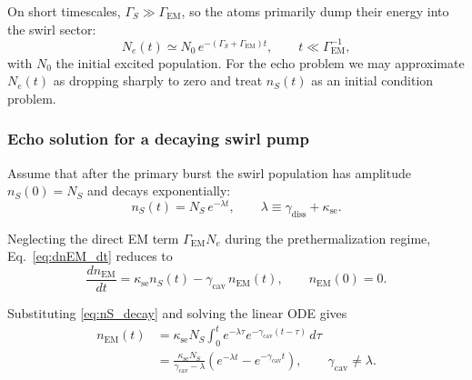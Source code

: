         On short timescales, $\Gamma_S \gg \Gamma_{\mathrm{EM}}$, so the atoms
        primarily dump their energy into the swirl sector:
        \begin{equation}
            N_e(t)
            \simeq
            N_0\, e^{-(\Gamma_S + \Gamma_{\mathrm{EM}}) t},
            \qquad
            t \ll \Gamma_{\mathrm{EM}}^{-1},
        \end{equation}
        with $N_0$ the initial excited population. For the echo problem we may
        approximate $N_e(t)$ as dropping sharply to zero and treat
        $n_S(t)$ as an initial condition problem.

    \subsubsection{Echo solution for a decaying swirl pump}
        \label{subsubsec:echo_solution}

        Assume that after the primary burst the swirl population has amplitude
        $n_S(0) = N_S$ and decays exponentially:
        \begin{equation}
            n_S(t)
            =
            N_S \, e^{-\lambda t},
            \qquad
            \lambda \equiv \gamma_{\mathrm{diss}} + \kappa_{\text{se}}.
            \label{eq:nS_decay}
        \end{equation}

        Neglecting the direct EM term $\Gamma_{\mathrm{EM}} N_e$ during the
        prethermalization regime, Eq.~\eqref{eq:dnEM_dt} reduces to
        \begin{equation}
            \frac{d n_{\mathrm{EM}}}{dt}
            =
            \kappa_{\text{se}} n_S(t)
            - \gamma_{\mathrm{cav}}\,n_{\mathrm{EM}}(t),
            \qquad
            n_{\mathrm{EM}}(0) = 0.
            \label{eq:dnEM_dt_reduced}
        \end{equation}

        Substituting \eqref{eq:nS_decay} and solving the linear ODE gives
        \begin{align}
            n_{\mathrm{EM}}(t)
            &=
            \kappa_{\text{se}} N_S
            \int_0^t e^{-\lambda \tau} e^{-\gamma_{\mathrm{cav}} (t-\tau)}\, d\tau
            \nonumber\\[4pt]
            &=
            \frac{\kappa_{\text{se}} N_S}{\gamma_{\mathrm{cav}} - \lambda}
            \left(
                e^{-\lambda t} - e^{-\gamma_{\mathrm{cav}} t}
            \right),
            \qquad
            \gamma_{\mathrm{cav}} \neq \lambda.
            \label{eq:nEM_solution}
        \end{align}

